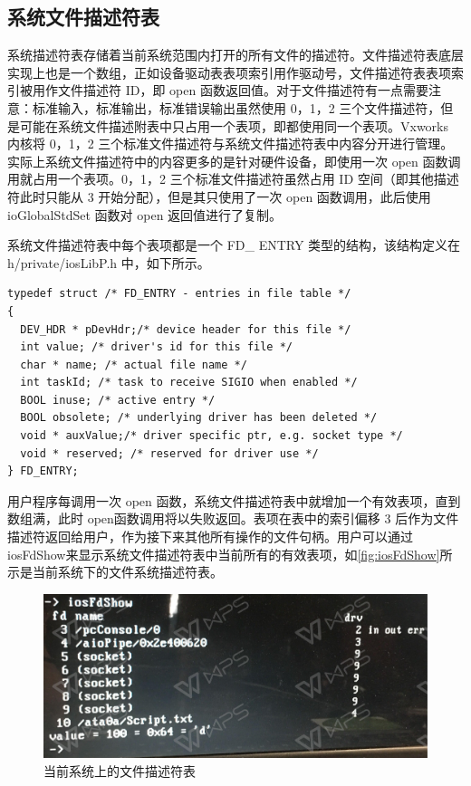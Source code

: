 \subsection{系统文件描述符表}
	系统描述符表存储着当前系统范围内打开的所有文件的描述符。文件描述符表底层实现上也是一个数组，正如设备驱动表表项索引用作驱动号，文件描述符表表项索引被用作文件描述符 ID，即 open 函数返回值。对于文件描述符有一点需要注意：标准输入，标准输出，标准错误输出虽然使用 0，1，2 三个文件描述符，但是可能在系统文件描述附表中只占用一个表项，即都使用同一个表项。Vxworks 内核将 0，1，2 三个标准文件描述符与系统文件描述符表中内容分开进行管理。实际上系统文件描述符中的内容更多的是针对硬件设备，即使用一次 open 函数调用就占用一个表项。0，1，2 三个标准文件描述符虽然占用 ID 空间（即其他描述符此时只能从 3 开始分配），但是其只使用了一次 open 函数调用，此后使用 ioGlobalStdSet 函数对 open 返回值进行了复制。
	
	系统文件描述符表中每个表项都是一个 FD\_ ENTRY 类型的结构，该结构定义在h/private/iosLibP.h 中，如下所示。
\lstset{language=C}
\begin{lstlisting}
typedef struct /* FD_ENTRY - entries in file table */ 
{ 
  DEV_HDR * pDevHdr;/* device header for this file */ 
  int value; /* driver's id for this file */ 
  char * name; /* actual file name */ 
  int taskId; /* task to receive SIGIO when enabled */ 
  BOOL inuse; /* active entry */ 
  BOOL obsolete; /* underlying driver has been deleted */ 
  void * auxValue;/* driver specific ptr, e.g. socket type */ 
  void * reserved; /* reserved for driver use */ 
} FD_ENTRY; 
\end{lstlisting}

用户程序每调用一次 open 函数，系统文件描述符表中就增加一个有效表项，直到数组满，此时 open函数调用将以失败返回。表项在表中的索引偏移 3 后作为文件描述符返回给用户，作为接下来其他所有操作的文件句柄。用户可以通过iosFdShow来显示系统文件描述符表中当前所有的有效表项，如\autoref{fig:iosFdShow}所示是当前系统下的文件系统描述符表。
\begin{figure}[!h]
\centering
\includegraphics[width=.9\textwidth]{./graphics/iosFdShow.pdf}
\caption{当前系统上的文件描述符表}\label{fig:iosFdShow}
\end{figure}

